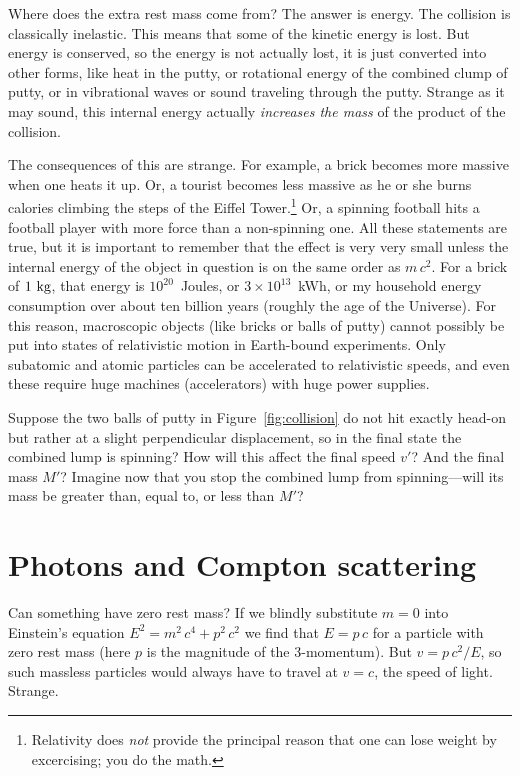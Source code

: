 Where does the extra rest mass come from?  The answer is energy.  The
collision is classically inelastic.  This means that some of the
kinetic energy is lost.  But energy is conserved, so the energy is not
actually lost, it is just converted into other forms, like heat in the
putty, or rotational energy of the combined clump of putty, or in
vibrational waves or sound traveling through the putty.  Strange as it
may sound, this internal energy actually {\em increases the mass\/} of
the product of the collision.

The consequences of this are strange.  For example, a brick becomes
more massive when one heats it up.  Or, a tourist becomes less massive
as he or she burns calories climbing the steps of the Eiffel
Tower.\footnote{Relativity does {\em not\/} provide the principal
reason that one can lose weight by excercising; you do the math.}  Or,
a spinning football hits a football player with more force than a
non-spinning one.  All these statements are true, but it is important
to remember that the effect is very very small unless the internal
energy of the object in question is on the same order as $m\,c^2$.
For a brick of $1~{\rm kg}$, that energy is $10^{20}$~Joules, or
$3\times10^{13}$~kWh, or my household energy consumption over about
ten billion years (roughly the age of the Universe).  For this reason,
macroscopic objects (like bricks or balls of putty) cannot possibly be
put into states of relativistic motion in Earth-bound experiments.
Only subatomic and atomic particles can be accelerated to relativistic
speeds, and even these require huge machines (accelerators) with huge
power supplies.

\begin{problem}
Suppose the two balls of putty in Figure~\ref{fig:collision} do not
hit exactly head-on but rather at a slight perpendicular displacement,
so in the final state the combined lump is spinning?  How will this
affect the final speed $v'$?  And the final mass $M'$?  Imagine now
that you stop the combined lump from spinning---will its mass be
greater than, equal to, or less than $M'$?
\end{problem}


\section{Photons and Compton scattering}
\label{sec:compton}

Can something have zero rest mass?  If we blindly substitute $m=0$
into Einstein's equation $E^2=m^2\,c^4+p^2\,c^2$ we find that $E=p\,c$
for a particle with zero rest mass (here $p$ is the magnitude of the
3-momentum).  But $v=p\,c^2/E$, so such massless particles would
always have to travel at $v=c$, the speed of light.  Strange.


